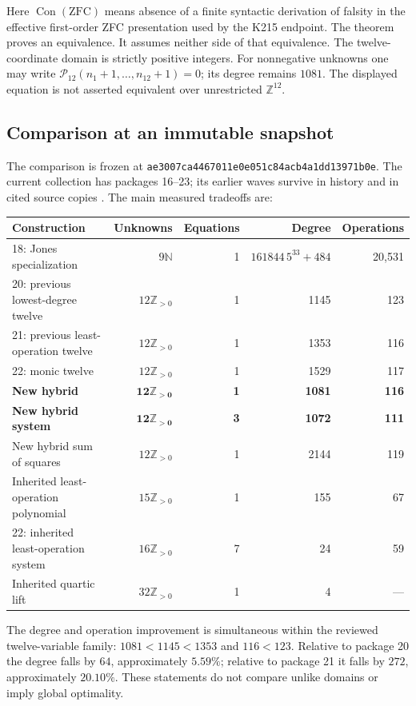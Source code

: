 \documentclass[11pt,a4paper]{article}
\theoremstyle{remark}\newtheorem{remark}[theorem]{Remark}
\newcommand{\NN}{\mathbb N}
\newcommand{\ZZ}{\mathbb Z}
\newcommand{\PP}{\mathbb Z_{>0}}
\newcommand{\Con}{\operatorname{Con}}
\newcommand{\ZFC}{\mathrm{ZFC}}
\newcommand{\pin}{\texttt{ae3007ca4467011e0e051c84acb4a1dd13971b0e}}
\begin{document}
Here $\Con(\ZFC)$ means absence of a finite syntactic derivation of falsity
in the effective first-order ZFC presentation used by the K215 endpoint.
The theorem proves an equivalence. It assumes neither side of that
equivalence. The twelve-coordinate domain is strictly positive integers.
For nonnegative unknowns one may write
$\mathcal P_{12}(n_1+1,\ldots,n_{12}+1)=0$; its degree remains $1081$.
The displayed equation is not asserted equivalent over unrestricted
$\ZZ^{12}$.

\subsection{Comparison at an immutable snapshot}

The comparison is frozen at \pin. The current collection has packages
16--23; its earlier waves survive in history and in cited source copies
\cite{catalogue}. The main measured tradeoffs are:

\begin{center}\small
\begin{tabular}{@{}lrrrr@{}}
\toprule
Construction & Unknowns & Equations & Degree & Operations\\
\midrule
18: Jones specialization & $9\NN$ & 1 & $161844\,5^{33}+484$ & 20,531\\
20: previous lowest-degree twelve & $12\PP$ & 1 & 1145 & 123\\
21: previous least-operation twelve & $12\PP$ & 1 & 1353 & 116\\
22: monic twelve & $12\PP$ & 1 & 1529 & 117\\
\textbf{New hybrid} & $\mathbf{12\PP}$ & \textbf{1} & \textbf{1081} & \textbf{116}\\
\textbf{New hybrid system} & $\mathbf{12\PP}$ & \textbf{3} & \textbf{1072} & \textbf{111}\\
New hybrid sum of squares & $12\PP$ & 1 & 2144 & 119\\
Inherited least-operation polynomial & $15\PP$ & 1 & 155 & 67\\
22: inherited least-operation system & $16\PP$ & 7 & 24 & 59\\
Inherited quartic lift & $32\PP$ & 1 & 4 & ---\\
\bottomrule
\end{tabular}
\end{center}

The degree and operation improvement is simultaneous within the reviewed
twelve-variable family: $1081<1145<1353$ and $116<123$.
Relative to package 20 the degree falls by $64$, approximately $5.59\%$;
relative to package 21 it falls by $272$, approximately $20.10\%$.
These statements do not compare unlike domains or imply global optimality.
\end{document}
